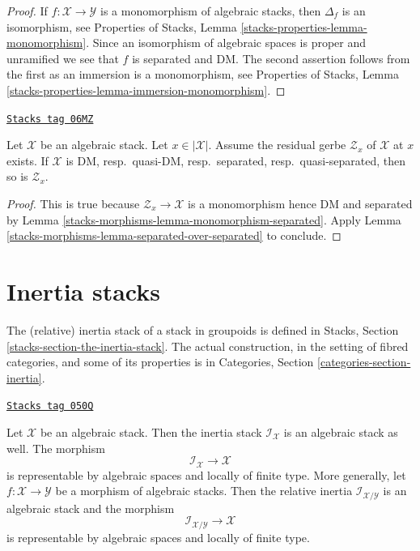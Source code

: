 \begin{proof}
If $f : \mathcal{X} \to \mathcal{Y}$ is a monomorphism of algebraic stacks,
then $\Delta_f$ is an isomorphism, see
Properties of Stacks, Lemma \ref{stacks-properties-lemma-monomorphism}.
Since an isomorphism of algebraic spaces is proper and unramified we
see that $f$ is separated and DM. The second assertion follows from the
first as an immersion is a monomorphism, see
Properties of Stacks,
Lemma \ref{stacks-properties-lemma-immersion-monomorphism}.
\end{proof}

\begin{lemma}
\label{stacks-morphisms-lemma-separation-properties-residual-gerbe}
\href{https://stacks.math.columbia.edu/tag/06MZ}{\texttt{Stacks tag 06MZ}}

Let $\mathcal{X}$ be an algebraic stack. Let $x \in |\mathcal{X}|$.
Assume the residual gerbe $\mathcal{Z}_x$ of $\mathcal{X}$ at $x$ exists.
If $\mathcal{X}$ is DM, resp.\ quasi-DM, resp.\ separated,
resp.\ quasi-separated, then so is $\mathcal{Z}_x$.
\end{lemma}

\begin{proof}
This is true because $\mathcal{Z}_x \to \mathcal{X}$ is a monomorphism
hence DM and separated by
Lemma \ref{stacks-morphisms-lemma-monomorphism-separated}.
Apply
Lemma \ref{stacks-morphisms-lemma-separated-over-separated}
to conclude.
\end{proof}

\section{Inertia stacks}
\label{stacks-morphisms-section-inertia}
The (relative) inertia stack of a stack in groupoids is defined in
Stacks, Section \ref{stacks-section-the-inertia-stack}.
The actual construction, in the setting of fibred categories, and some
of its properties is in
Categories, Section \ref{categories-section-inertia}.

\begin{lemma}[Inertia]
\label{stacks-morphisms-lemma-inertia}
\href{https://stacks.math.columbia.edu/tag/050Q}{\texttt{Stacks tag 050Q}}

Let $\mathcal{X}$ be an algebraic stack. Then the inertia stack
$\mathcal{I}_\mathcal{X}$ is an algebraic stack as well.
The morphism
$$
\mathcal{I}_\mathcal{X} \longrightarrow \mathcal{X}
$$
is representable by algebraic spaces and locally of finite type.
More generally, let $f : \mathcal{X} \to \mathcal{Y}$ be a morphism
of algebraic stacks. Then the relative inertia
$\mathcal{I}_{\mathcal{X}/\mathcal{Y}}$ is an algebraic stack and the
morphism
$$
\mathcal{I}_{\mathcal{X}/\mathcal{Y}} \longrightarrow \mathcal{X}
$$
is representable by algebraic spaces and locally of finite type.
\end{lemma}

